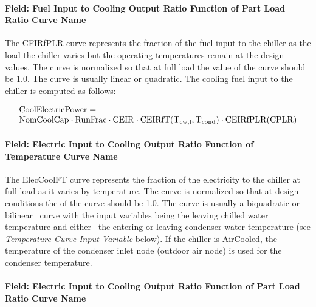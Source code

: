 \paragraph{Field: Fuel Input to Cooling Output Ratio Function of Part Load Ratio Curve Name}\label{field-fuel-input-to-cooling-output-ratio-function-of-part-load-ratio-curve-name}

The CFIRfPLR curve represents the fraction of the fuel input to the chiller as the load the chiller varies but the operating temperatures remain at the design values. The curve is normalized so that at full load the value of the curve should be 1.0. The curve is usually linear or quadratic. The cooling fuel input to the chiller is computed as follows:

\begin{equation}
    \begin{array}{l}
        \rm{CoolElectricPower} = \\
        \rm{NomCoolCap} \cdot \rm{RunFrac} \cdot \rm{CEIR} \cdot \rm{CEIRfT}(T_{cw,l}, T_{cond}) \cdot \rm{CEIRfPLR}(\rm{CPLR})
    \end{array}
\end{equation}

\paragraph{Field: Electric Input to Cooling Output Ratio Function of Temperature Curve Name}\label{field-electric-input-to-cooling-output-ratio-function-of-temperature-curve-name-2}

The ElecCoolFT curve represents the fraction of the electricity to the chiller at full load as it varies by temperature. The curve is normalized so that at design conditions the of the curve should be 1.0. The curve is usually a biquadratic or bilinear~ curve with the input variables being the leaving chilled water temperature and either~ the entering or leaving condenser water temperature (see \emph{Temperature Curve Input Variable} below). If the chiller is AirCooled, the temperature of the condenser inlet node (outdoor air node) is used for the condenser temperature.

\paragraph{Field: Electric Input to Cooling Output Ratio Function of Part Load Ratio Curve Name}\label{field-electric-input-to-cooling-output-ratio-function-of-part-load-ratio-curve-name-2}

